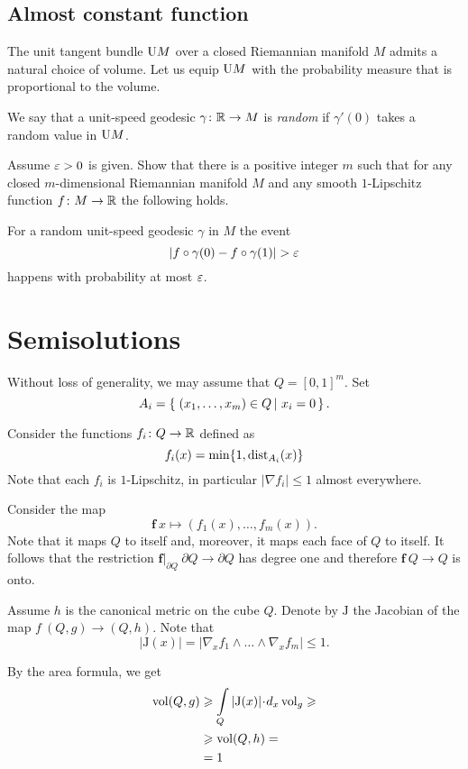 \subsection*{Almost constant function}
\label{Almost constant function}

The unit tangent bundle $\mathrm{U} M$ over a closed Riemannian manifold $M$
admits a natural choice of volume.
Let us equip $\mathrm{U} M$ with the probability measure that is proportional to the volume.

We say that a unit-speed geodesic $\gamma\colon\mathbb{R}\to M$ is \emph{random}
if $\gamma'(0)$ takes a random value in $\mathrm{U} M$.

\begin{pr}
Assume $\varepsilon>0$ is given.
Show that there is a positive integer $m$ such that
for any closed $m$-dimensional Riemannian manifold $M$
and any smooth $1$-Lipschitz function $f\colon M\to\mathbb{R}$ the following holds.

For a random unit-speed geodesic $\gamma$ in $M$ 
the event 
\[|f\circ\gamma(0)-f\circ\gamma(1)|>\eps\]
happens with probability at most $\varepsilon$.
\end{pr}


\section*{Semisolutions}

Without loss of generality, we may assume that $Q=[0,1]^m$.
Set 
\[A_i=\set{(x_1,\dots,x_m)\in Q}{x_i=0}.\]

Consider the functions $f_i\colon Q\to\mathbb{R}$ defined as
$$f_i(x)=\min \{1,\operatorname{\rm dist}\nolimits_{A_i}(x)\}$$
Note that each $f_i$ is $1$-Lipschitz, 
in particular $|\nabla f_i|\le 1$ almost everywhere.

Consider the map
\[\bm{f}\:x\mapsto(f_1(x),\dots,f_m(x)).\]
Note that it maps $Q$ to itself
and, moreover, it maps each face of $Q$ to itself.
It follows that the restriction $\bm{f}|_{\partial Q}\:\partial Q\to \partial Q$ has degree one and therefore 
$\bm{f}\:Q\to Q$ is onto.

Assume $h$ is the canonical metric on the cube $Q$.
Denote by $\mathrm{J}$ the Jacobian of the map $f\:(Q,g)\to (Q,h)$.
Note that 
\[|\mathrm{J}(x)|=|\nabla_x f_1\wedge\dots\wedge\nabla_xf_m|\le 1.\]

By the area formula, we get 
\begin{align*}
\vol(Q,g)
&\ge \int\limits_Q|\mathrm{J}(x)|\cdot d_x\vol_g\ge
\\
&\ge\vol(Q,h)=\\
&=1
\end{align*}

